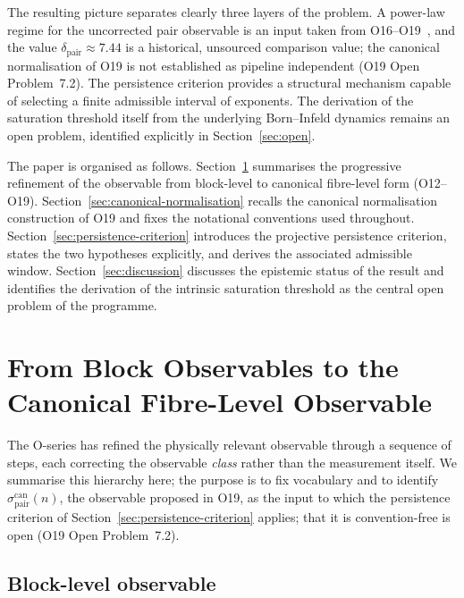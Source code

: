 \documentclass[11pt,a4paper]{article}
\theoremstyle{definition}
\theoremstyle{remark}
\begin{document}
    The resulting picture separates clearly three layers of the problem.
    A power-law regime for the uncorrected pair observable is an input taken from
    O16--O19~\cite{Beau2026a20,Beau2026a21,Beau2026a22,Beau2026a23}, and the value
    $\delta_{\mathrm{pair}} \approx 7.44$ is a historical, unsourced comparison value; the
    canonical normalisation of O19 is not established as pipeline independent (O19 Open Problem~7.2).
    The persistence criterion provides a structural mechanism capable
    of selecting a finite admissible interval of exponents.
    The derivation of the saturation threshold itself from the underlying
    Born--Infeld dynamics remains an open problem, identified explicitly
    in Section~\ref{sec:open}.

    The paper is organised as follows.
    Section~\ref{sec:observable-hierarchy} summarises the progressive
    refinement of the observable from block-level to canonical
    fibre-level form (O12--O19).
    Section~\ref{sec:canonical-normalisation} recalls the canonical
    normalisation construction of O19 and fixes the notational
    conventions used throughout.
    Section~\ref{sec:persistence-criterion} introduces the projective
    persistence criterion, states the two hypotheses explicitly, and
    derives the associated admissible window.
    Section~\ref{sec:discussion} discusses the epistemic status of the
    result and identifies the derivation of the intrinsic saturation
    threshold as the central open problem of the programme.


  \section{From Block Observables to the Canonical Fibre-Level Observable}
    \label{sec:observable-hierarchy}

    The O-series has refined the physically relevant observable through a
    sequence of steps, each correcting the observable \emph{class} rather
    than the measurement itself.
    We summarise this hierarchy here; the purpose is to fix vocabulary
    and to identify $\sigma_{\mathrm{pair}}^{\mathrm{can}}(n)$, the observable proposed in O19,
    as the input to which the persistence criterion of
    Section~\ref{sec:persistence-criterion} applies; that it is convention-free is open
    (O19 Open Problem~7.2).

    \subsection{Block-level observable}
      \label{sec:block-obs}
\end{document}
